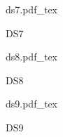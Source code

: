 \documentclass[a4paper]{article}
\newcommand{\incfig}[1]{%
    \def\svgwidth{\columnwidth}
    {#1.pdf_tex}
}
\begin{document}
\begin{figure}[ht]
    \centering
    \begin{minipage}[c][\totalheight][c]{\columnwidth}
    \incfig{ds7}
    \caption{DS7}
    \end{minipage}
    \label{fig:ds7}
\end{figure}

\begin{figure}[ht]
    \centering
    \begin{minipage}[c][\totalheight][c]{\columnwidth}
    \incfig{ds8}
    \caption{DS8}
    \end{minipage}
    \label{fig:ds8}
\end{figure}

\begin{figure}[ht]
    \centering
    \begin{minipage}[c][\totalheight][c]{0.5\columnwidth}
    \incfig{ds9}
    \caption{DS9}
    \end{minipage}
    \label{fig:ds9}
\end{figure}
\end{document}
